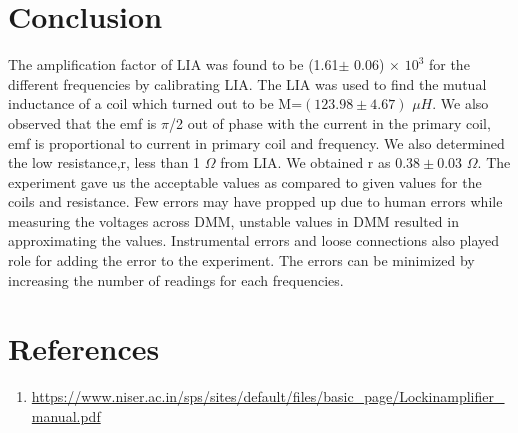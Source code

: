 \documentclass[a4paper, amsfonts, amssymb, amsmath, reprint, showkeys, nofootinbib, twoside]{revtex4-1}
\begin{document}
\section{Conclusion}
The amplification factor of LIA was found to be (1.61$\pm$ 0.06) $\times$ $10^3$ for the different frequencies by calibrating LIA. The LIA was used to find the mutual inductance of a coil which turned out to be  M=$(123.98\pm4.67)$ $\mu H$. We also observed that the emf is $\pi$/2 out of phase with the current in the primary coil, emf is proportional to current in primary coil and frequency. We also determined the low resistance,r, less than 1 $\Omega$ from LIA. We obtained r as $0.38\pm0.03$ $\Omega$. 
The experiment gave us the acceptable values as compared to given values for the coils and resistance. Few errors may have propped up due to human errors while measuring the voltages across DMM, unstable values in DMM resulted in approximating the values. Instrumental errors and loose connections also played role for adding the error to the experiment. The errors can be minimized by increasing the number of readings for each frequencies. 

\section{References}
\begin{enumerate}
\item{\url{https://www.niser.ac.in/sps/sites/default/files/basic_page/Lockinamplifier_manual.pdf}}

\end{enumerate}
\end{document}
